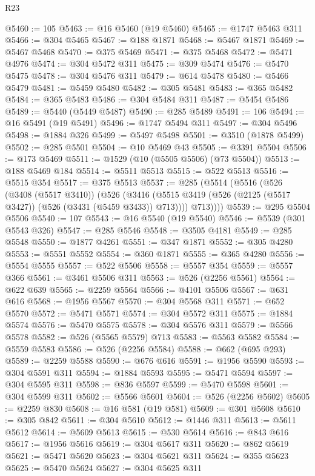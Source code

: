 \begin{lexlean}{R23}
\begin{coremodule}
@5460 := 105
@5463 := @16 @5460 (@19 @5460)
@5465 := @1747 @5463 @311
@5466 := @304 @5465
@5467 := @188 @1871
@5468 := @5467 @1871
@5469 := @5467 @5468
@5470 := @375 @5469
@5471 := @375 @5468
@5472 := @5471 @4976
@5474 := @304 @5472 @311
@5475 := @309 @5474
@5476 := @5470 @5475
@5478 := @304 @5476 @311
@5479 := @614 @5478
@5480 := @5466 @5479
@5481 := @5459 @5480
@5482 := @305 @5481
@5483 := @365 @5482
@5484 := @365 @5483
@5486 := @304 @5484 @311
@5487 := @5454 @5486
@5489 := @5440 (@5449 @5487)
@5490 := @285 @5489
@5491 := 106
@5494 := @16 @5491 (@19 @5491)
@5496 := @1747 @5494 @311
@5497 := @304 @5496
@5498 := @1884 @326
@5499 := @5497 @5498
@5501 := @3510 (@1878 @5499)
@5502 := @285 @5501
@5504 := @10 @5469 @43
@5505 := @3391 @5504
@5506 := @173 @5469
@5511 := @1529 (@10 (@5505 @5506) (@73 @5504))
@5513 := @188 @5469 @184
@5514 := @5511 @5513
@5515 := @522 @5513
@5516 := @5515 @354
@5517 := @375 @5513
@5537 := @285
    (@5514
      (@5516
        (@526
          (@3408 (@5517 @3410))
          (@526
            (@3416 (@5515 @3419 (@526 (@2125 (@5517 @3427)) (@526 (@3431 (@5459 @3433)) @713))))
            @713))))
@5539 := @295 @5504 @5506
@5540 := 107
@5543 := @16 @5540 (@19 @5540)
@5546 := @5539 (@301 @5543 @326)
@5547 := @285 @5546
@5548 := @3505 @4181
@5549 := @285 @5548
@5550 := @1877 @4261
@5551 := @347 @1871
@5552 := @305 @4280
@5553 := @5551 @5552
@5554 := @360 @1871
@5555 := @365 @4280
@5556 := @5554 @5555
@5557 := @522 @5506
@5558 := @5557 @354
@5559 := @5557 @366
@5561 := @3461 @5506 @311
@5563 := @526 (@2256 @5561)
@5564 := @622 @639
@5565 := @2259 @5564
@5566 := @4101 @5506
@5567 := @631 @616
@5568 := @1956 @5567
@5570 := @304 @5568 @311
@5571 := @652 @5570
@5572 := @5471 @5571
@5574 := @304 @5572 @311
@5575 := @1884 @5574
@5576 := @5470 @5575
@5578 := @304 @5576 @311
@5579 := @5566 @5578
@5582 := @526 (@5565 @5579) @713
@5583 := @5563 @5582
@5584 := @5559 @5583
@5586 := @526 (@2256 @5584)
@5588 := @662 (@695 @293)
@5589 := @2259 @5588
@5590 := @676 @616
@5591 := @1956 @5590
@5593 := @304 @5591 @311
@5594 := @1884 @5593
@5595 := @5471 @5594
@5597 := @304 @5595 @311
@5598 := @836 @5597
@5599 := @5470 @5598
@5601 := @304 @5599 @311
@5602 := @5566 @5601
@5604 := @526 (@2256 @5602)
@5605 := @2259 @830
@5608 := @16 @581 (@19 @581)
@5609 := @301 @5608
@5610 := @305 @842
@5611 := @304 @5610
@5612 := @1446 @311
@5613 := @5611 @5612
@5614 := @5609 @5613
@5615 := @530 @5614
@5616 := @843 @616
@5617 := @1956 @5616
@5619 := @304 @5617 @311
@5620 := @862 @5619
@5621 := @5471 @5620
@5623 := @304 @5621 @311
@5624 := @355 @5623
@5625 := @5470 @5624
@5627 := @304 @5625 @311

\end{coremodule}
\end{lexlean}
